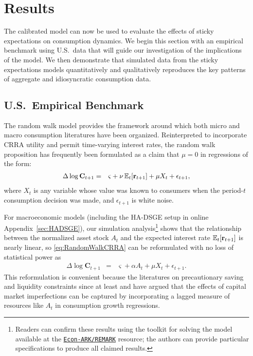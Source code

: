 \documentclass[titlepage]{./econtex}
\begin{document}
\section{Results}\label{sec:Results}

The calibrated model can now be used to evaluate the effects of sticky expectations on consumption dynamics.  We begin this section with an empirical benchmark using U.S.\ data that will guide our investigation of the implications of the model.  We then demonstrate that simulated data from the sticky expectations models quantitatively and qualitatively reproduces the key patterns of aggregate and idiosyncratic consumption data.

\subsection{U.S.\ Empirical Benchmark}
\label{sec:EmpBenchmark}

The random walk model provides the framework around which both micro and macro consumption literatures have been organized.  Reinterpreted to incorporate CRRA utility and permit time-varying interest rates, the random walk proposition has frequently been formulated as a claim that $\mu=0$ in regressions of the form:
\begin{eqnarray}
  \label{eq:RandomWalkCRRA}
  \Delta \log \mathbf{C}_{t+1} & = & \varsigma+\nu \operatorname{\mathbb{E}}_{t}[\mathbf{r}_{t+1}]+\mu X_{t}+\epsilon_{t+1},
\end{eqnarray}
where $X_{t}$ is any variable whose value was known to consumers
when the period-$t$ consumption decision was made, and $\epsilon_{t+1}$
is white noise.

For macroeconomic models (including the HA-DSGE setup in online Appendix~\ref{sec:HADSGE}), our simulation analysis\footnote{Readers can confirm these results using the toolkit for solving the model available at the \href{https://github.com/econ-ark/REMARK/tree/master/REMARKs/cAndCwithStickyE}{\texttt{Econ-ARK/REMARK}} resource; the authors can provide particular specifications to produce all claimed results.}
shows that the relationship between the normalized asset stock $A_{t}$ and the expected interest rate $\operatorname{\mathbb{E}}_{t}[\mathbf{r}_{t+1}]$ is nearly linear, so \eqref{eq:RandomWalkCRRA} can be reformulated with no loss of statistical power as
\begin{eqnarray*}
  \label{eq:RandomWalkAForm}
  \Delta \log \mathbf{C}_{t+1} & = & \varsigma+\alpha A_{t}+\mu X_{t}+\epsilon_{t+1}.
\end{eqnarray*}
This reformulation is convenient because the literatures on precautionary saving and liquidity constraints since at least \cite{zeldes:jpe} and \citeyear{zeldesStochastic} have argued that the effects of capital market imperfections can be captured by incorporating a lagged measure of resources like $A_{t}$ in consumption growth regressions.
\end{document}
